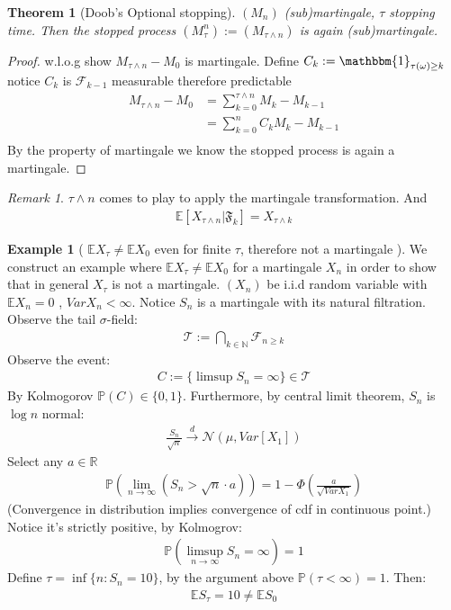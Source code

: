 \documentclass[a4paper,11pt]{book}
\newtheorem{theorem}{Theorem}[section]
\theoremstyle{definition}
\newtheorem*{example}{Example}
\theoremstyle{remark}
\newtheorem*{remark}{Remark}
\begin{document}
\begin{theorem}[Doob's Optional stopping]
	$(M_n)$ (sub)martingale, $\tau$ stopping time. Then the stopped process $(M_\tau^n) := (M_{\tau \wedge n})$ is again (sub)martingale.
\end{theorem}
\begin{proof}
	w.l.o.g show $M_{\tau \wedge n} - M_0$ is martingale. Define $C_k:=\mathbbm{1}_{\tau(\omega) \geq k}$ notice $C_k$ is $\mathcal{F}_{k-1}$ measurable therefore predictable
	\begin{align*}
		M_{\tau \wedge n} - M_0 &= \sum_{k = 0}^{\tau \wedge n} M_k  - M_{k-1}\\
		&= \sum_{k = 0}^{n} C_k M_k - M_{k-1}\\
	\end{align*}
	By the property of martingale we know the stopped process is again a martingale.
\end{proof}
\begin{remark}
$\tau \wedge n$ comes to play to apply the martingale transformation. And 
\begin{align*}
	\mathbb{E}[X_{\tau \wedge n}|\mathfrak{F}_k] = X_{\tau \wedge k}
\end{align*}
\end{remark}

\begin{example}[ $\mathbb{E} X_\tau \neq \mathbb{E} X_0$ even for finite $\tau$, therefore not a martingale ]
We construct an example where $\mathbb{E} X_\tau \neq \mathbb{E} X_0$ for a martingale $X_n$ in order to show that in general $X_\tau$ is not a martingale.
$(X_n)$ be i.i.d  random variable with $\mathbb{E}X_n = 0$ , $VarX_n < \infty$. Notice $S_n$ is a martingale with its natural filtration. Observe the tail $\sigma$-field:
\begin{align*}
	\mathcal{T}:= \bigcap_{k \in \mathbb{N}} \mathcal{F}_{n \geq k}
\end{align*}	
Observe the event:
\begin{align*}
	C:= \{ \limsup S_n = \infty \} \in \mathcal{T}
\end{align*}
By Kolmogorov $\mathbb{P}(C) \in \{0, 1\}$. Furthermore, by central limit theorem, $S_n$ is $\log n$ normal:
\begin{align*}
	\frac{S_n}{\sqrt{n}} \overset{d}{\rightarrow} \mathcal{N}(\mu, Var[X_1])
\end{align*}
Select any $a \in \mathbb{R}$
\begin{align*}
	\mathbb{P}( \lim_{n \rightarrow \infty}( S_n > \sqrt{n} \cdot a))   = 1 - \Phi(\frac{a}{\sqrt{VarX_1}}) 
\end{align*}
(Convergence in distribution implies convergence of cdf in continuous point.) Notice it's strictly positive, by Kolmogrov:
\begin{align*}
	\mathbb{P}(\limsup_{n \rightarrow \infty} S_n = \infty) = 1
\end{align*}
Define $\tau = \inf \{n: S_n = 10\}$, by the argument above $\mathbb{P}(\tau < \infty) = 1$. Then:
\begin{align*}
	\mathbb{E}S_\tau = 10 \neq \mathbb{E}S_0
\end{align*}
\end{example}
\end{document}
